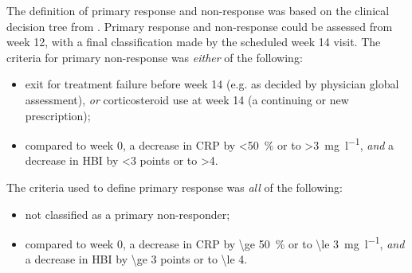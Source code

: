 The definition of primary response and non-response was based on the clinical decision tree from \textcite{kennedy2019PredictorsAntiTNFTreatment}.
Primary response and non-response could be assessed from week 12, with a final classification made by the scheduled week 14 visit. 
The criteria for primary non-response was \emph{either} of the following: 
\begin{itemize}
    \item exit for treatment failure before week 14 (e.g. as decided by physician global assessment), \emph{or} corticosteroid use at week 14 (a continuing or new prescription);
    \item compared to week 0, a decrease in \gls{CRP} by \SI{<50}{\percent} or to \SI{>3}{\milli\gram\per\litre}, \emph{and} a decrease in \gls{HBI} by \num{<3} points or to \num{>4}.
\end{itemize}
The criteria used to define primary response was \emph{all} of the following:
\begin{itemize}
    \item not classified as a primary non-responder;
    \item compared to week 0, a decrease in \gls{CRP} by \SI{\ge 50}{\percent} or to \SI{\le 3}{\milli\gram\per\litre}, \emph{and} a decrease in \gls{HBI} by \num{\ge 3} points or to \num{\le 4}.
\end{itemize}

